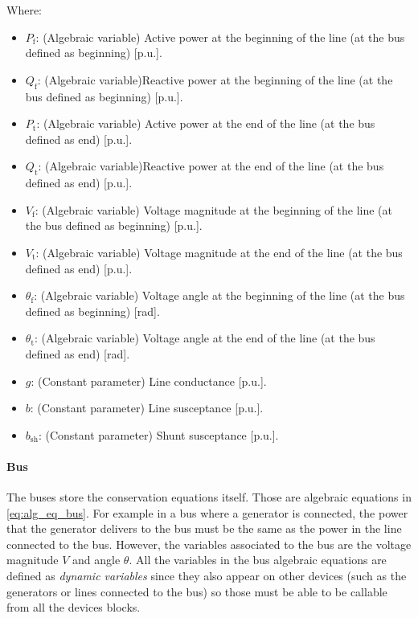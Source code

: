 \begin{itemize}
Where:
\begin{itemize}
  \item $P_{\text{f}}$: (Algebraic variable) Active power at the beginning of the line (at the bus defined as beginning) [p.u.].
  \item $Q_{\text{f}}$: (Algebraic variable)Reactive power at the beginning of the line (at the bus defined as beginning) [p.u.].
  \item $P_{\text{t}}$: (Algebraic variable) Active power at the end of the line (at the bus defined as end) [p.u.].
  \item $Q_{\text{t}}$: (Algebraic variable)Reactive power at the end of the line (at the bus defined as end) [p.u.].
  \item $V_\text{f}$: (Algebraic variable) Voltage magnitude at the beginning of the line (at the bus defined as beginning) [p.u.].
  \item $V_\text{t}$: (Algebraic variable) Voltage magnitude at the end of the line (at the bus defined as end) [p.u.].
  \item $\theta_\text{f}$: (Algebraic variable) Voltage angle at the beginning of the line (at the bus defined as beginning) [rad].
  \item $\theta_\text{t}$: (Algebraic variable) Voltage angle at the end of the line (at the bus defined as end) [rad].
  \item $g$: (Constant parameter) Line conductance [p.u.].
  \item $b$: (Constant parameter) Line susceptance [p.u.].
  \item $b_{\text{sh}}$: (Constant parameter) Shunt susceptance [p.u.].
\end{itemize}

\end{itemize}

\paragraph{Bus}
The buses store the conservation equations itself. Those are algebraic equations in \eqref{eq:alg_eq_bus}. For example in a bus where a 
generator is connected, the power that the generator delivers to the bus must be the same as the power in the line connected to the bus. However, the
variables associated to the bus are the voltage magnitude $V$ and angle $\theta$.
All the variables in the bus algebraic equations are defined as \textit{dynamic variables} since they also appear on other devices (such as 
the generators or lines connected to the bus) so those must be able to be callable from all the devices blocks.

